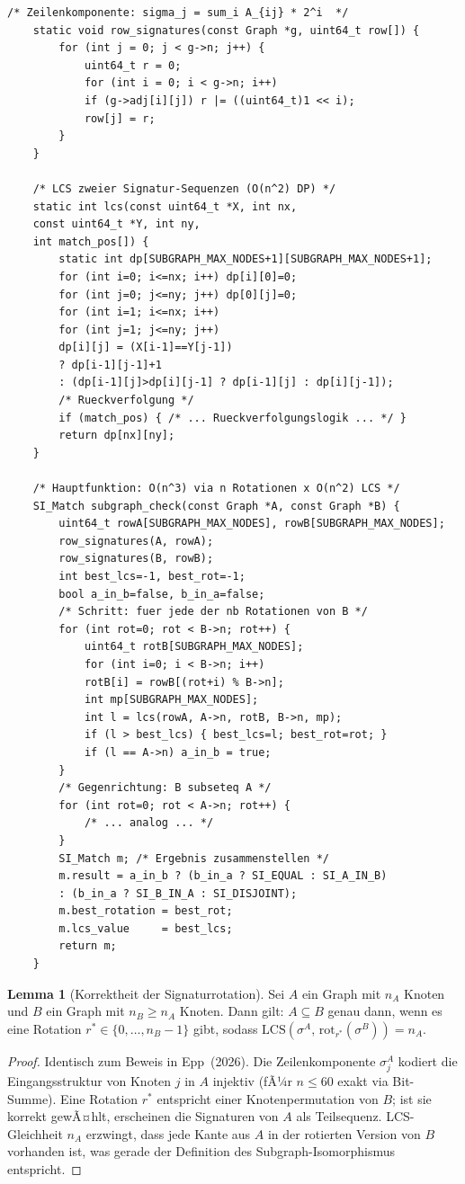 ﻿\documentclass[a4paper,12pt]{article}
\theoremstyle{definition}
\newtheorem{lemma}{Lemma}
\begin{document}
\begin{lstlisting}[style=cstyle, caption={Signaturfunktion und LCS-Kern
		(subgraph.c)}, label=lst:subgraph-kern]
	/* Zeilenkomponente: sigma_j = sum_i A_{ij} * 2^i  */
	static void row_signatures(const Graph *g, uint64_t row[]) {
		for (int j = 0; j < g->n; j++) {
			uint64_t r = 0;
			for (int i = 0; i < g->n; i++)
			if (g->adj[i][j]) r |= ((uint64_t)1 << i);
			row[j] = r;
		}
	}
	
	/* LCS zweier Signatur-Sequenzen (O(n^2) DP) */
	static int lcs(const uint64_t *X, int nx,
	const uint64_t *Y, int ny,
	int match_pos[]) {
		static int dp[SUBGRAPH_MAX_NODES+1][SUBGRAPH_MAX_NODES+1];
		for (int i=0; i<=nx; i++) dp[i][0]=0;
		for (int j=0; j<=ny; j++) dp[0][j]=0;
		for (int i=1; i<=nx; i++)
		for (int j=1; j<=ny; j++)
		dp[i][j] = (X[i-1]==Y[j-1])
		? dp[i-1][j-1]+1
		: (dp[i-1][j]>dp[i][j-1] ? dp[i-1][j] : dp[i][j-1]);
		/* Rueckverfolgung */
		if (match_pos) { /* ... Rueckverfolgungslogik ... */ }
		return dp[nx][ny];
	}
	
	/* Hauptfunktion: O(n^3) via n Rotationen x O(n^2) LCS */
	SI_Match subgraph_check(const Graph *A, const Graph *B) {
		uint64_t rowA[SUBGRAPH_MAX_NODES], rowB[SUBGRAPH_MAX_NODES];
		row_signatures(A, rowA);
		row_signatures(B, rowB);
		int best_lcs=-1, best_rot=-1;
		bool a_in_b=false, b_in_a=false;
		/* Schritt: fuer jede der nb Rotationen von B */
		for (int rot=0; rot < B->n; rot++) {
			uint64_t rotB[SUBGRAPH_MAX_NODES];
			for (int i=0; i < B->n; i++)
			rotB[i] = rowB[(rot+i) % B->n];
			int mp[SUBGRAPH_MAX_NODES];
			int l = lcs(rowA, A->n, rotB, B->n, mp);
			if (l > best_lcs) { best_lcs=l; best_rot=rot; }
			if (l == A->n) a_in_b = true;
		}
		/* Gegenrichtung: B subseteq A */
		for (int rot=0; rot < A->n; rot++) {
			/* ... analog ... */
		}
		SI_Match m; /* Ergebnis zusammenstellen */
		m.result = a_in_b ? (b_in_a ? SI_EQUAL : SI_A_IN_B)
		: (b_in_a ? SI_B_IN_A : SI_DISJOINT);
		m.best_rotation = best_rot;
		m.lcs_value     = best_lcs;
		return m;
	}
\end{lstlisting}

\begin{lemma}[Korrektheit der Signaturrotation]
	\label{lem:rotation}
	Sei $A$ ein Graph mit $n_A$ Knoten und $B$ ein Graph mit $n_B \geq n_A$
	Knoten. Dann gilt: $A \subseteq B$ genau dann, wenn es eine Rotation
	$r^* \in \{0, \ldots, n_B - 1\}$ gibt, sodass
	$\mathrm{LCS}(\sigma^A,\, \mathrm{rot}_{r^*}(\sigma^B)) = n_A$.
\end{lemma}

\begin{proof}
	Identisch zum Beweis in Epp~(2026). Die Zeilenkomponente $\sigma_j^A$
	kodiert die Eingangsstruktur von Knoten $j$ in $A$ injektiv (fÃ¼r $n \leq 60$
	exakt via Bit-Summe). Eine Rotation $r^*$ entspricht einer Knotenpermutation
	von $B$; ist sie korrekt gewÃ¤hlt, erscheinen die Signaturen von $A$ als
	Teilsequenz. LCS-Gleichheit $n_A$ erzwingt, dass jede Kante aus $A$ in der
	rotierten Version von $B$ vorhanden ist, was gerade der Definition des
	Subgraph-Isomorphismus entspricht.
\end{proof}
\end{document}
